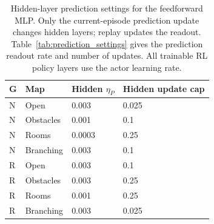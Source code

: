 \begin{table}[htbp]\centering\footnotesize
\setlength{\tabcolsep}{3.5pt}
\caption{Hidden-layer prediction settings for the feedforward MLP. Only the current-episode prediction update changes hidden layers; replay updates the readout. Table~\ref{tab:prediction_settings} gives the prediction readout rate and number of updates. All trainable RL policy layers use the actor learning rate.}\label{tab:mlp_settings}
\begin{tabular}{@{}llll@{}}\toprule
G & Map & Hidden $\eta_P$ & Hidden update cap\\\midrule
N & Open & 0.003 & 0.025\\
N & Obstacles & 0.001 & 0.1\\
N & Rooms & 0.0003 & 0.25\\
N & Branching & 0.003 & 0.1\\
R & Open & 0.003 & 0.1\\
R & Obstacles & 0.003 & 0.25\\
R & Rooms & 0.001 & 0.25\\
R & Branching & 0.003 & 0.025\\
\bottomrule\end{tabular}
\end{table}
